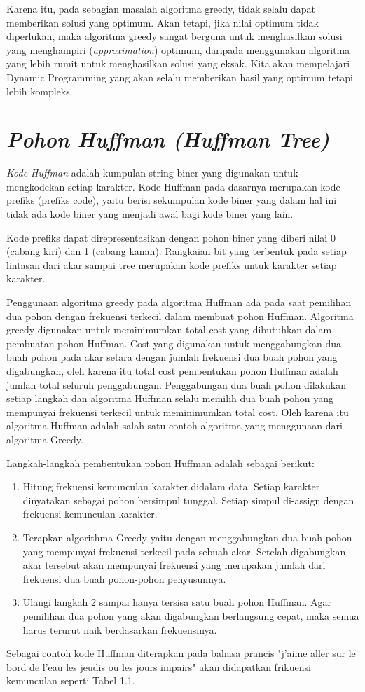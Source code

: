 Karena itu, pada sebagian masalah algoritma greedy, tidak selalu dapat memberikan solusi yang optimum. Akan tetapi, jika nilai optimum tidak diperlukan, maka algoritma greedy sangat berguna untuk menghasilkan solusi yang menghampiri (\textit{approximation}) optimum, daripada menggunakan algoritma yang lebih rumit untuk menghasilkan solusi yang eksak. Kita akan mempelajari Dynamic Programming yang akan selalu memberikan hasil yang optimum tetapi lebih kompleks.

\section{\textit{Pohon Huffman (Huffman Tree)}}

\textit{Kode Huffman} adalah kumpulan string biner yang digunakan untuk mengkodekan setiap karakter. Kode Huffman pada dasarnya merupakan kode prefiks (prefiks code), yaitu berisi sekumpulan kode biner yang dalam hal ini tidak ada kode biner yang menjadi awal bagi kode biner yang lain.

Kode prefiks dapat direpresentasikan dengan pohon biner yang diberi nilai 0 (cabang kiri) dan 1 (cabang kanan). Rangkaian bit yang terbentuk pada setiap lintasan dari akar sampai tree merupakan kode prefiks untuk karakter setiap karakter.

Penggunaan algoritma greedy pada algoritma Huffman ada pada saat pemilihan dua pohon dengan frekuensi terkecil dalam membuat pohon Huffman. Algoritma greedy digunakan untuk meminimumkan total cost yang dibutuhkan dalam pembuatan pohon Huffman. Cost yang digunakan untuk menggabungkan dua buah pohon pada akar setara dengan jumlah frekuensi dua buah pohon yang digabungkan, oleh karena itu total cost pembentukan pohon Huffman adalah jumlah total seluruh penggabungan. Penggabungan dua buah pohon dilakukan setiap langkah dan algoritma Huffman selalu memilih dua buah pohon yang mempunyai frekuensi terkecil untuk meminimumkan total cost. Oleh karena itu algoritma Huffman adalah salah satu contoh algoritma yang menggunaan dari algoritma Greedy.

Langkah-langkah pembentukan pohon Huffman adalah sebagai berikut:
\begin{enumerate}
\item Hitung frekuensi kemunculan karakter didalam data. Setiap karakter dinyatakan sebagai pohon bersimpul tunggal. Setiap simpul di-assign dengan frekuensi kemunculan karakter.
\item Terapkan algorithma Greedy yaitu dengan menggabungkan dua buah pohon yang mempunyai frekuensi terkecil pada sebuah akar. Setelah digabungkan akar tersebut akan mempunyai frekuensi yang merupakan jumlah dari frekuensi dua buah pohon-pohon penyusunnya.
\item Ulangi langkah 2 sampai hanya tersisa satu buah pohon Huffman. Agar pemilihan dua pohon yang akan digabungkan berlangsung cepat, maka semua harus terurut naik berdasarkan frekuensinya.
\end{enumerate}
Sebagai contoh kode Huffman diterapkan pada bahasa prancis "j'aime aller sur le bord de l'eau les jeudis ou les jours impairs" akan didapatkan frikuensi kemunculan seperti Tabel 1.1.


